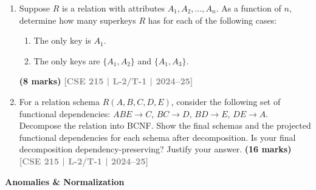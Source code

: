 \documentclass[12pt,a3paper]{article}
\newcommand{\yr}[1]{\hfill\textcolor{gray}{\small\textbf{[#1]}}}
\newcommand{\mk}[1]{\textcolor{orange!70!black}{\small\textbf{(#1 marks)}}}
\newcommand{\subtopic}[2]{%
  \vspace{10pt}
  \noindent\begin{tcolorbox}[colback=#1!8,colframe=#1,boxrule=0.6pt,arc=4pt,
    left=6pt,right=6pt,top=4pt,bottom=4pt]
    \small\bfseries\textcolor{#1}{#2}
  \end{tcolorbox}
  \vspace{2pt}
}
\begin{document}
\begin{enumerate}
\item Suppose $R$ is a relation with attributes $A_1, A_2, \ldots, A_n$. As a function of $n$, determine how many superkeys $R$ has for each of the following cases:
\begin{enumerate}
  \item The only key is $A_1$.
  \item The only keys are $\{A_1, A_2\}$ and $\{A_1, A_3\}$.
\end{enumerate}
\mk{8} \yr{CSE 215 | L-2/T-1 | 2024--25}

\item For a relation schema $R(A,B,C,D,E)$, consider the following set of functional dependencies: $ABE \to C$, $BC \to D$, $BD \to E$, $DE \to A$. Decompose the relation into BCNF. Show the final schemas and the projected functional dependencies for each schema after decomposition. Is your final decomposition dependency-preserving? Justify your answer.
\mk{16} \yr{CSE 215 | L-2/T-1 | 2024--25}

\end{enumerate}

\subtopic{cC}{Anomalies \& Normalization}
\label{sub:s4-anomaly}
\end{document}

